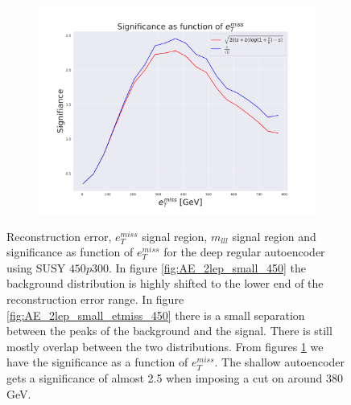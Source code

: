 \begin{figure}[H]
    \hfill  
    \begin{subfigure}{.50\textwidth}
        \includegraphics[width=\textwidth]{Figures/AE_testing/small/2lep/significance_etmiss_450p0p0300_-1.7167506533614734.pdf}
        \caption{}
        \label{fig:AE_2lep_small_signi_450}
    \end{subfigure}
    \hfill      
    \caption[2lep shallow network | $450p300$ | AE]{Reconstruction error, $e_T^{miss}$ signal region, $m_{lll}$ signal region and significance as function of 
    $e_T^{miss}$ for the deep regular autoencoder using SUSY $450p300$. In figure \ref{fig:AE_2lep_small_450} the background distribution is highly shifted to the lower end of the 
    reconstruction error range. In figure \ref{fig:AE_2lep_small_etmiss_450} there is a small separation between the peaks of the background
    and the signal. There is still mostly overlap between the two distributions.
    From figures  \ref{fig:AE_2lep_small_signi_450} we have the significance as a function of $e_T^{miss}$. 
    The shallow autoencoder gets a significance of almost 2.5 when imposing a cut on around 380 GeV.}
    \label{fig:AE_2lep_small_rec_sig_signi_450}
\end{figure}



